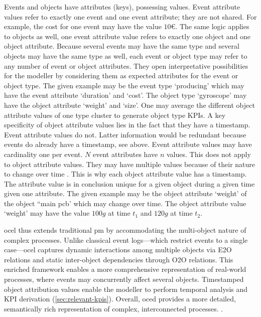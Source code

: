 Events and objects have attributes (keys), possessing values. Event attribute values refer to exactly one event and one event attribute; they are not shared. For example, the cost for one event may have the value $10€$. The same logic applies to objects as well, one event attribute value refers to exactly one object and one object attribute. Because several events may have the same type and several objects may have the same type as well, each event or object type may refer to any number of event or object attributes. They open interpretative possibilities for the modeller by considering them as expected attributes for the event or object type. The given example may be the event type `producing' which may have the event attribute `duration' and `cost'. The object type `gyroscope' may have the object attribute `weight' and `size'. One may average the different object attribute values of one type cluster to generate object type KPIs. A key specificity of object attribute values lies in the fact that they have a timestamp. Event attribute values do not. Latter information would be redundant because events do already have a timestamp, see above. Event attribute values may have cardinality one per event. $N$ event attributes have $n$ values. This does not apply to object attribute values. They may have multiple values because of their nature to change over time \autocite{van2023object}. This is why each object attribute value has a timestamp. The attribute value is in conclusion unique for a given object during a given time given one attribute. The given example may be the object attribute `weight' of the object ``main pcb' which may change over time. The object attribute value `weight' may have the value $100g$ at time $t_1$ and $120g$ at time $t_2$.

\gls{ocel} thus extends traditional \gls{pm} by accommodating the  multi-object nature of complex processes. Unlike classical event logs—which restrict events to a single case—\gls{ocel} captures dynamic interactions among multiple objects via E2O relations and static inter-object dependencies through O2O relations. This enriched framework enables a more comprehensive representation of real-world processes, where events may concurrently affect several objects. Timestamped object attribution values enable the modeller to perform temporal analysis and KPI derivation (\autoref{sec:relevant-kpis}). Overall, \gls{oced} provides a more detailed, semantically rich representation of complex, interconnected processes. \autocite{van2023object}.

